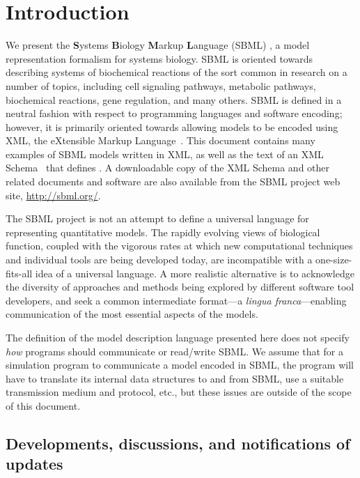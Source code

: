 
\section{Introduction}
\label{sec:introduction}

We present the \textbf{S}ystems \textbf{B}iology \textbf{M}arkup
\textbf{L}anguage (SBML) \changed{\sbmltwothree}, a model
representation formalism for systems biology.  SBML is oriented
towards describing systems of biochemical reactions of the sort
common in research on a number of topics, including cell signaling
pathways, metabolic pathways, biochemical reactions, gene
regulation, and many others.  SBML is defined in a neutral fashion
with respect to programming languages and software encoding;
however, it is primarily oriented towards allowing models to be
encoded using XML, the eXtensible Markup
Language~\citep{bosak:1999,bray:2000}.  This document contains
many examples of SBML models written in XML, as well as the text
of an XML Schema~\citep{biron:2000,fallside:2000,thompson:2000}
that defines \changed{\sbmltwothree}.  A downloadable copy of the XML Schema
and other related documents and software are also available from
the SBML project web site, \url{http://sbml.org/}.

The SBML project is not an attempt to define a universal language
for representing quantitative models.  The rapidly evolving views
of biological function, coupled with the vigorous rates at which
new computational techniques and individual tools are being
developed today, are incompatible with a one-size-fits-all idea of
a universal language. A more realistic alternative is to
acknowledge the diversity of approaches and methods being explored
by different software tool developers, and seek a common
intermediate format---a \emph{lingua franca}---enabling
communication of the most essential aspects of the models.

The definition of the model description language presented here
does not specify \emph{how} programs should communicate or
read/write SBML.  We assume that for a simulation program to
communicate a model encoded in SBML, the program will have to
translate its internal data structures to and from SBML, use a
suitable transmission medium and protocol, etc., but these issues
are outside of the scope of this document.

\subsection{Developments, discussions, and notifications of updates}

